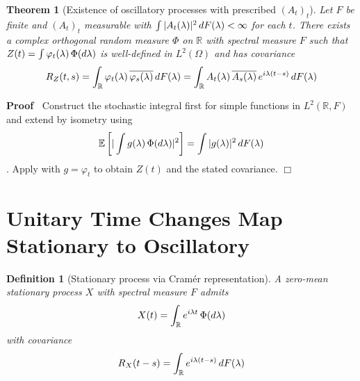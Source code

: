 \documentclass{article}
\newenvironment{proof}{\noindent\textbf{Proof\ }}{\hspace*{\fill}$\Box$\medskip}
\newtheorem{definition}{Definition}
\newtheorem{theorem}{Theorem}
\begin{document}
\begin{theorem}
  [Existence of oscillatory processes with prescribed $(A_t)_t$] Let $F$ be
  finite and $(A_t)_t$ measurable with $\int |A_t (\lambda) |^2 
  \hspace{0.17em} dF (\lambda) < \infty$ for each $t$. There exists a complex
  orthogonal random measure $\Phi$ on $\mathbb{R}$ with spectral measure $F$
  such that $Z (t) = \int \varphi_t (\lambda)  \hspace{0.17em} \Phi (d
  \lambda)$ is well-defined in $L^2 (\Omega)$ and has covariance
  \begin{equation}
    R_Z (t, s) = \int_{\mathbb{R}} \varphi_t (\lambda) \hspace{0.17em}
    \overline{\varphi_s (\lambda)} \hspace{0.17em} dF (\lambda) =
    \int_{\mathbb{R}} A_t (\lambda) \hspace{0.17em} \overline{A_s (\lambda)}
    \hspace{0.17em} e^{i \lambda (t - s)}  \hspace{0.17em} dF (\lambda)
  \end{equation}
\end{theorem}

\begin{proof}
  Construct the stochastic integral first for simple functions in $L^2 
  (\mathbb{R}, F)$ and extend by isometry using
  \begin{equation}
    \mathbb{E} \left[ | \int g (\lambda) \hspace{0.17em} \Phi (d \lambda) |^2
    \right] = \int |g (\lambda) |^2  \hspace{0.17em} dF (\lambda)
  \end{equation}
  . Apply with $g = \varphi_t$ to obtain $Z (t)$ and the stated covariance.
\end{proof}

\section{Unitary Time Changes Map Stationary to Oscillatory}

\begin{definition}
  [Stationary process via Cram{\'e}r representation] A zero-mean stationary
  process $X$ with spectral measure $F$ admits
  \begin{equation}
    X (t) = \int_{\mathbb{R}} e^{i \lambda t}  \hspace{0.17em} \Phi (d
    \lambda)
  \end{equation}
  with covariance
  \begin{equation}
    R_X  (t - s) = \int_{\mathbb{R}} e^{i \lambda (t - s)}  \hspace{0.17em} dF
    (\lambda)
  \end{equation}
\end{definition}
\end{document}

